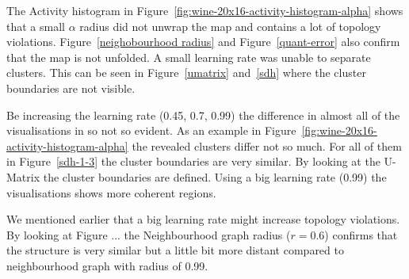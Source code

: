 \documentclass{acm_proc_article-sp}
\begin{document}
The Activity histogram in Figure~\ref{fig:wine-20x16-activity-histogram-alpha} shows that a small $\alpha$ radius did not unwrap the map and contains
a lot of topology violations. Figure~\ref{neighobourhood radius} and Figure~\ref{quant-error} also confirm that the map is not unfolded.
A small learning rate was unable to separate clusters. This can be seen in Figure~\ref{umatrix} and~\ref{sdh} where the cluster boundaries are not visible.

Be increasing the learning rate (0.45, 0.7, 0.99) the difference in almost all of the visualisations in so not so evident.
As an example in Figure~\ref{fig:wine-20x16-activity-histogram-alpha} the revealed clusters differ not so much. For all of 
them in Figure~\ref{sdh-1-3} the cluster boundaries are very similar. By looking at the U-Matrix the cluster boundaries are
defined. Using a big learning rate (0.99) the visualisations shows more coherent regions.

We mentioned earlier that a big learning rate might increase topology violations. By looking at Figure ... the Neighbourhood graph radius ($r=0.6$) confirms that
the structure is very similar but a little bit more distant compared to neighbourhood graph with radius of 0.99.
\end{document}
